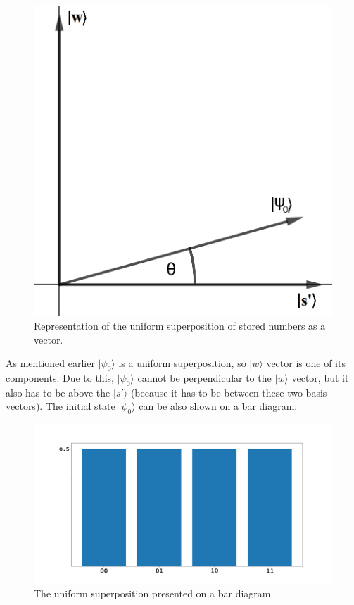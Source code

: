 \begin{figure}[ht]
\centering
\includegraphics[scale=0.25]{grover_1}
\caption{Representation of the uniform superposition of stored numbers as a vector.}
\end{figure}

As mentioned earlier $|\psi_0\rangle$ is a uniform superposition, so $|w\rangle$ vector is one of its components. Due to this, $|\psi_0\rangle$ cannot be perpendicular to the $|w\rangle$ vector, but it also has to be above the $|s'\rangle$ (because it has to be between these two basis vectors). The initial state $|\psi_0\rangle$ can be also shown on a bar diagram:

\begin{figure}[ht]
\centering
\includegraphics[scale=0.25]{grover_bars_1}
\caption{The uniform superposition presented on a bar diagram.}
\end{figure}

